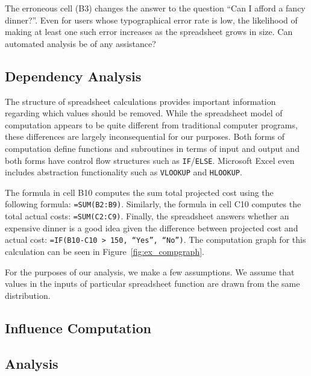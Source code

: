 The erroneous cell (B3) changes the answer to the question ``Can I afford a fancy dinner?''.  Even for users whose typographical error rate is low, the likelihood of making at least one such error increases as the spreadsheet grows in size.  Can automated analysis be of any assistance?

\subsection{Dependency Analysis}

The structure of spreadsheet calculations provides important information regarding which values should be removed.  While the spreadsheet model of computation appears to be quite different from traditional computer programs, these differences are largely inconsequential for our purposes.  Both forms of computation define functions and subroutines in terms of input and output and both forms have control flow structures such as \texttt{IF}/\texttt{ELSE}.  Microsoft Excel even includes abstraction functionality such as \texttt{VLOOKUP} and \texttt{HLOOKUP}.

The formula in cell B10 computes the sum total projected cost using the following formula: \texttt{=SUM(B2:B9)}.  Similarly, the formula in cell C10 computes the total actual costs: \texttt{=SUM(C2:C9)}.  Finally, the spreadsheet answers whether an expensive dinner is a good idea given the difference between projected cost and actual cost: \texttt{=IF(B10-C10 > 150, ``Yes'', ``No'')}.  The computation graph for this calculation can be seen in Figure~\ref{fig:ex_compgraph}.



For the purposes of our analysis, we make a few assumptions.  We assume that values in the inputs of particular spreadsheet function are drawn from the same distribution.  

\subsection{Influence Computation}

\subsection{Analysis}
